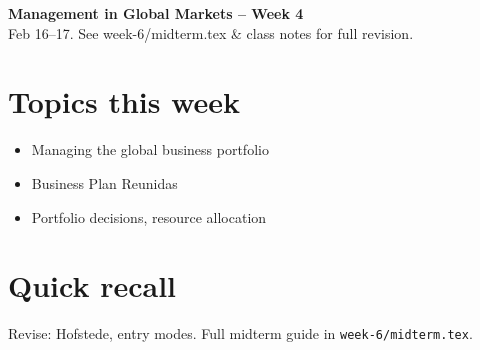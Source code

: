 \documentclass[10pt,a4paper]{article}
\begin{document}
\begin{center}
{\large\bfseries\color{eublue} Management in Global Markets -- Week 4}\\[0.2em]
\footnotesize Feb 16--17. See week-6/midterm.tex \& class notes for full revision.
\end{center}\vspace{0.5em}

\section*{\color{eublue}Topics this week}
\begin{itemize}
\item Managing the global business portfolio
\item Business Plan Reunidas
\item Portfolio decisions, resource allocation
\end{itemize}

\section*{Quick recall}
Revise: Hofstede, entry modes. Full midterm guide in \texttt{week-6/midterm.tex}.
\end{document}
